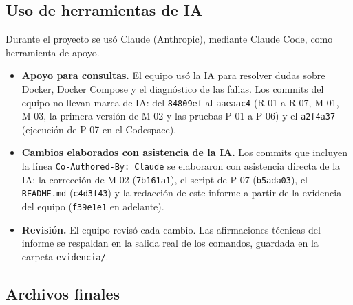\documentclass[11pt,a4paper]{article}
\newcommand{\cod}[1]{\texttt{#1}}
\begin{document}
\subsection{Uso de herramientas de IA}\label{anx:ia}
Durante el proyecto se usó Claude (Anthropic), mediante Claude Code, como herramienta de apoyo.

\begin{itemize}
  \item \textbf{Apoyo para consultas.} El equipo usó la IA para resolver dudas sobre Docker, Docker Compose y el diagnóstico de las fallas. Los commits del equipo no llevan marca de IA: del \cod{84809ef} al \cod{aaeaac4} (R-01 a R-07, M-01, M-03, la primera versión de M-02 y las pruebas P-01 a P-06) y el \cod{a2f4a37} (ejecución de P-07 en el Codespace).
  \item \textbf{Cambios elaborados con asistencia de la IA.} Los commits que incluyen la línea \cod{Co-Authored-By: Claude} se elaboraron con asistencia directa de la IA: la corrección de M-02 (\cod{7b161a1}), el script de P-07 (\cod{b5ada03}), el \cod{README.md} (\cod{c4d3f43}) y la redacción de este informe a partir de la evidencia del equipo (\cod{f39e1e1} en adelante).
  \item \textbf{Revisión.} El equipo revisó cada cambio. Las afirmaciones técnicas del informe se respaldan en la salida real de los comandos, guardada en la carpeta \cod{evidencia/}.
\end{itemize}

\clearpage
\subsection{Archivos finales}\label{anx:archivos}





\end{document}

